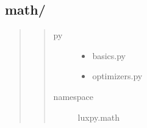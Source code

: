\documentclass[letterpaper,10pt,english]{sphinxmanual}
\begin{document}
\subsection{math/}
\label{\detokenize{utils:math}}\begin{quote}
\begin{quote}\begin{description}
\item[{py}] \leavevmode\begin{itemize}
\item {} 
basics.py

\item {} 
optimizers.py

\end{itemize}

\item[{namespace}] \leavevmode
luxpy.math

\end{description}\end{quote}
\end{quote}
\label{\detokenize{utils:module-luxpy.utils.math}}
\end{document}
